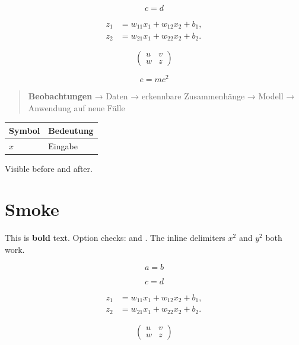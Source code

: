 \[
c = d
\]

\[
\begin{aligned}
z_1 &= w_{11}x_1+w_{12}x_2+b_1, \\
z_2 &= w_{21}x_1+w_{22}x_2+b_2.
\end{aligned}
\]

\[\begin{pmatrix}
u & v \\
w & z
\end{pmatrix}\]


\begin{equation}
e = mc^2
\end{equation}

\begin{quote}
\textbf{Beobachtungen} → Daten → erkennbare Zusammenhänge → Modell → Anwendung auf neue Fälle
\end{quote}

\par\addvspace{\medskipamount}
\noindent\begin{tabularx}{\linewidth}{@{}>{\raggedright\arraybackslash}X>{\raggedright\arraybackslash}X@{}}
\toprule
Symbol & Bedeutung \\
\midrule
$x$ & Eingabe \\
\bottomrule
\end{tabularx}
\par\addvspace{\medskipamount}

%
%
%
Visible before %
and after.

\section{Smoke}

This is \textbf{bold} text.
Option checks: \cite{single} and \parencite{group}.
The inline delimiters $x^2$ and \(y^2\) both work.

\[
a = b
\]

\[
c = d
\]

\[
\begin{aligned}
z_1 &= w_{11}x_1+w_{12}x_2+b_1, \\
z_2 &= w_{21}x_1+w_{22}x_2+b_2.
\end{aligned}
\]

\[\begin{pmatrix}
u & v \\
w & z
\end{pmatrix}\]


